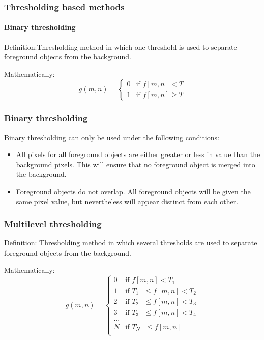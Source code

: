 \begin{frame}
\frametitle{Thresholding based methods}
\framesubtitle{Binary thresholding}
\logoCSIPCPL\mypagenum
	\begin{block}{Definition:}Thresholding method in which one threshold is used to separate foreground objects from the background.
	\end{block}
	\begin{block}{Mathematically:}
		\begin{equation}
			g(m,n) = 
			\begin{cases}
				0 & \text{if $f[m,n] < T$} \\
				1 & \text{if $f[m,n] \geq T$}
			\end{cases}
		\end{equation}
	\end{block}
\end{frame}




\begin{frame}
\frametitle{Binary thresholding}
\logoCSIPCPL\mypagenum
	Binary thresholding can only be used under the following conditions:
	\begin{itemize}
		\item All pixels for all foreground objects are either greater or less in value than the background pixels.  This will ensure that no foreground object is merged into the background.
		\item Foreground objects do not overlap.  All foreground objects will be given the same pixel value, but nevertheless will appear distinct from each other.
	\end{itemize}
\end{frame}




\begin{frame}
\frametitle{Multilevel thresholding}
\logoCSIPCPL\mypagenum
	\begin{block}{Definition:}
		Thresholding method in which several thresholds are used to separate foreground objects from the background.
	\end{block}

	\begin{block}{Mathematically:}
		\begin{equation}
			g(m,n) = 
			\begin{cases}
				0 & \text{if  \ \ \ \ \ \ \ \ \ \  \ $f[m,n] < T_1$} \\
				1 & \text{if  \ $T_1 \ \ \ \leq  f[m,n] < T_2 $} \\
				2 & \text{if  \ $T_2 \ \ \ \leq  f[m,n] < T_3 $} \\
				3 & \text{if  \ $T_3 \ \ \ \leq  f[m,n] < T_4 $} \\
				... \\
				N & \text{if \  $T_{N} \ \ \ \leq  f[m,n]$} \\
			\end{cases}
		\end{equation}
	\end{block}
\end{frame}







